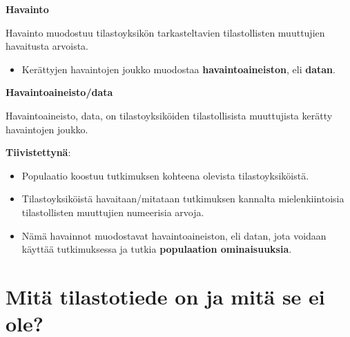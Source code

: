 \documentclass[
]{book}
\providecommand{\tightlist}{%
  \setlength{\itemsep}{0pt}\setlength{\parskip}{0pt}}
\begin{document}
\begin{defblock}{}
\textbf{Havainto}

Havainto muodostuu tilastoyksikön tarkasteltavien tilastollisten muuttujien havaitusta arvoista.

\end{defblock}

\begin{itemize}
\tightlist
\item
  Kerättyjen havaintojen joukko muodostaa \textbf{havaintoaineiston}, eli \textbf{datan}.
\end{itemize}

\begin{defblock}{}
\textbf{Havaintoaineisto/data}

Havaintoaineisto, data, on tilastoyksiköiden tilastollisista muuttujista kerätty havaintojen joukko.

\end{defblock}

\textbf{Tiivistettynä}:

\begin{itemize}
\tightlist
\item
  Populaatio koostuu tutkimuksen kohteena olevista tilastoyksiköistä.
\item
  Tilastoyksiköistä havaitaan/mitataan tutkimuksen kannalta mielenkiintoisia tilastollisten muuttujien numeerisia arvoja.
\item
  Nämä havainnot muodostavat havaintoaineiston, eli datan, jota voidaan käyttää tutkimuksessa ja tutkia \textbf{populaation ominaisuuksia}.
\end{itemize}

\newpage

\hypertarget{alaluku32}{%
\section{Mitä tilastotiede on ja mitä se ei ole?}\label{alaluku32}}
\end{document}
